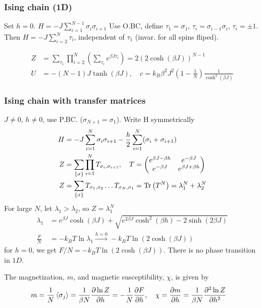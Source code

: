 \documentclass[a4paper, english, 12pt]{article}
\newcommand{\closed}[1]{\left( #1 \right)}
\newcommand{\curly}[1]{\{ #1 \} }
\begin{document}
\begin{multicols*}{2}
\subsubsection*{\scriptsize Ising chain (1D)}
Set $h=0$. $H = -J\sum_{i=1}^{N-1} \sigma_i \sigma_{i+1}$ Use O.BC, define $\tau_1=\sigma_1,\,\tau_i=\sigma_{i-1}\sigma_i$, $\tau_i=\pm1$. Then $H=-J\sum_{i=2}^N \tau_i$, independent of $\tau_1$ (invar. for all spins fliped). 

\begin{align*}
    Z &= \sum_{\tau_1} \prod_{i=2}^N \closed{\sum_{\tau_i} e^{\beta J \tau_i}} = 2(2\cosh(\beta J))^{N-1} \\ 
    U &= -(N-1)J\tanh(\beta J),\quad c = k_B \beta^2 J^2 \closed{1-\frac{1}{N}} \frac{1}{\cosh^2(\beta J)}
\end{align*} 


\subsubsection*{\scriptsize Ising chain with transfer matrices}
$J\neq0$, $h\neq0$, use P.BC. ($\sigma_{N+1}=\sigma_1$). Write H symmetrically 
\begin{align*}
    H &= -J\sum_{i=1}^N \sigma_i \sigma_{i+1} - \frac{h}{2}\sum_{i=1}^N (\sigma_i+\sigma_{i+1}) \\
    Z &= \sum_{\curly{\sigma}} \prod_{i=1}^N T_{\sigma_i,\sigma_{i+1}},\quad T = \begin{pmatrix}
        e^{\beta J-\beta h} & e^{-\beta J} \\ 
        e^{-\beta J} & e^{\beta J + \beta h}
    \end{pmatrix} \\
    Z &= \sum_{\curly{\sigma}} T_{\sigma_1,\sigma_2} \dots T_{\sigma_N,\sigma_1} = \Tr\closed{T^N} = \lambda_1^N + \lambda_2^N
\end{align*}
For large $N$, let $\lambda_1>\lambda_2$, so $Z = \lambda_1^N$
\begin{align*}
    \lambda_1 &= e^{\beta J}\cosh(\beta J) + \sqrt{e^{2\beta J}\cosh^2(\beta h)-2\sinh(2\beta J) } \\ 
    \frac{F}{N} &=-k_B T \ln\lambda_1 \xrightarrow{h=0} -k_B T \ln(2\cosh(\beta J))
\end{align*}
for $h=0$, we get $F/N=-k_B T \ln(2\cosh(\beta J))$. There is no phase transition in $1D$. 

The magnetization, $m$, and magnetic susceptibility, $\chi$, is given by 
\begin{align*}
    m &= \frac{1}{N} \expval{\sigma_j} = \frac{1}{\beta N} \pdv{\ln Z}{h} = -\frac{1}{N}\pdv{F}{h},\quad \chi = \pdv{m}{h} = \frac{1}{\beta N} \pdv[2]{\ln Z}{h}
\end{align*}




\end{multicols*}
\end{document}
